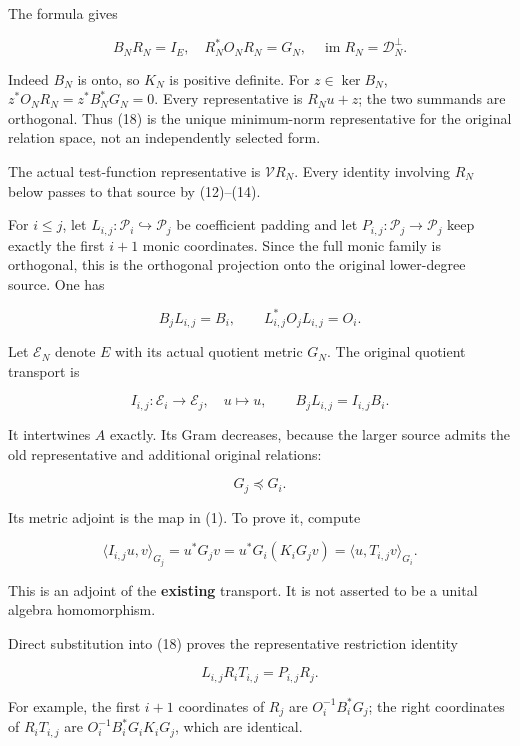The formula gives

\[
 B_NR_N=I_E,\quad R_N^*O_NR_N=G_N,\quad
 \operatorname{im}R_N=\mathcal D_N^\perp.                          \tag{19}
\]

Indeed \(B_N\) is onto, so \(K_N\) is positive definite. For \(z\in\ker B_N\), \(z^*O_NR_N=z^*B_N^*G_N=0\). Every representative is \(R_Nu+z\); the two summands are orthogonal. Thus (18) is the unique minimum-norm representative for the original relation space, not an independently selected form.

The actual test-function representative is \(\mathcal V R_N\). Every identity involving \(R_N\) below passes to that source by (12)--(14).

For \(i\le j\), let \(L_{i,j}:\mathcal P_i\hookrightarrow\mathcal P_j\) be coefficient padding and let \(P_{i,j}:\mathcal P_j\to\mathcal P_j\) keep exactly the first \(i+1\) monic coordinates. Since the full monic family is orthogonal, this is the orthogonal projection onto the original lower-degree source. One has

\[
 B_jL_{i,j}=B_i,\qquad L_{i,j}^*O_jL_{i,j}=O_i.                   \tag{20}
\]

Let \(\mathscr E_N\) denote \(E\) with its actual quotient metric \(G_N\). The original quotient transport is

\[
 I_{i,j}:\mathscr E_i\to\mathscr E_j,\quad u\mapsto u,
 \qquad B_jL_{i,j}=I_{i,j}B_i.                                    \tag{21}
\]

It intertwines \(A\) exactly. Its Gram decreases, because the larger source admits the old representative and additional original relations:

\[
 G_j\preceq G_i.                                                  \tag{22}
\]

Its metric adjoint is the map in (1). To prove it, compute

\[
 \langle I_{i,j}u,v\rangle_{G_j}
 =u^*G_jv
 =u^*G_i(K_iG_jv)
 =\langle u,T_{i,j}v\rangle_{G_i}.                                \tag{23}
\]

This is an adjoint of the \textbf{existing} transport. It is not asserted to be a unital algebra homomorphism.

Direct substitution into (18) proves the representative restriction identity

\[
 \boxed{L_{i,j}R_iT_{i,j}=P_{i,j}R_j.}                             \tag{24}
\]

For example, the first \(i+1\) coordinates of \(R_j\) are \(O_i^{-1}B_i^*G_j\); the right coordinates of \(R_iT_{i,j}\) are \(O_i^{-1}B_i^*G_iK_iG_j\), which are identical.

